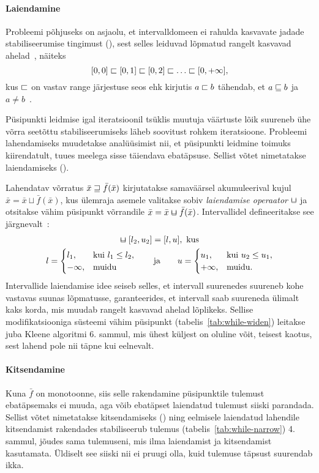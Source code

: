 \documentclass[../thesis.tex]{subfiles}
\begin{document}
\paragraph{Laiendamine}
Probleemi põhjuseks on asjaolu, et intervalldomeen ei rahulda kasvavate jadade stabiliseerumise tingimust (), sest selles leiduvad lõpmatud rangelt kasvavad ahelad~\cite[56]{seidl_foundations}, näiteks
\[
	[0, 0] \sqsubset [0, 1] \sqsubset [0, 2] \sqsubset \ldots \sqsubset [0, +\infty],
\]
kus $\sqsubset$ on vastav range järjestuse seos ehk kirjutis $a \sqsubset b$ tähendab, et $a \sqsubseteq b$ ja $a \neq b$~\cite[3]{laan_voreteooria}.

Püsipunkti leidmise igal iteratsioonil tsüklis muutuja väärtuste lõik suureneb ühe võrra seetõttu stabiliseerumiseks läheb soovitust rohkem iteratsioone. Probleemi lahendamiseks muudetakse analüüsimist nii, et püsipunkti leidmine toimuks kiirendatult, tuues meelega sisse täiendava ebatäpsuse. Sellist võtet nimetatakse laiendamiseks ().

Lahendatav võrratus $\bar{x} \sqsupseteq \bar{f}(\bar{x})$ kirjutatakse samaväärsel akumuleerival kujul $\bar{x} = \bar{x} \sqcup \bar{f}(\bar{x})$, kus ülemraja asemele valitakse sobiv \emph{laiendamise operaator} $\widen$ ja otsitakse vähim püsipunkt võrrandile $\bar{x} = \bar{x} \widen \bar{f}(\bar{x})$. Intervallidel defineeritakse see järgnevalt~\cite[62]{seidl_foundations}:
\begin{gather*}
	[l_1, u_1] \widen [l_2, u_2] = [l, u], \text{ kus} \\
	l = \begin{cases}
		l_1, & \text{kui } l_1 \leq l_2, \\
		-\infty, & \text{muidu}
	\end{cases}
	\qquad \text{ja} \qquad
	u = \begin{cases}
		u_1, & \text{kui } u_2 \leq u_1, \\
		+\infty, & \text{muidu}.
	\end{cases}
\end{gather*}
Intervallide laiendamise idee seiseb selles, et intervall suurenedes suureneb kohe vastavas suunas lõpmatusse, garanteerides, et intervall saab suureneda ülimalt kaks korda, mis muudab rangelt kasvavad ahelad lõplikeks. Sellise modifikatsiooniga süsteemi vähim püsipunkt (tabelis~\ref{tab:while-widen}) leitakse juba Kleene algoritmi 6. sammul, mis ühest küljest on oluline võit, teisest kaotus, sest lahend pole nii täpne kui eelnevalt.

\paragraph{Kitsendamine}
Kuna $\bar{f}$ on monotoonne, siis selle rakendamine püsipunktile tulemust ebatäpsemaks ei muuda, aga võib ebatäpset laiendatud tulemust siiski parandada. Sellist võtet nimetatakse kitsendamiseks () ning eelmisele laiendatud lahendile kitsendamist rakendades stabiliseerub tulemus (tabelis~\ref{tab:while-narrow}) 4. sammul, jõudes sama tulemuseni, mis ilma laiendamist ja kitsendamist kasutamata. Üldiselt see siiski nii ei pruugi olla, kuid tulemuse täpsust suurendab ikka.
\end{document}
